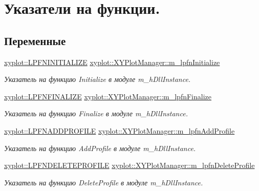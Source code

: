 \hypertarget{group__gr_func_pointers}{\section{Указатели на функции.}
\label{group__gr_func_pointers}
}
\subsection*{Переменные}
\begin{DoxyCompactItemize}
\item 
\hyperlink{namespacexyplot_a8c5635641ba2648c95a8b29c01393f78}{xyplot\-::\-L\-P\-F\-N\-I\-N\-I\-T\-I\-A\-L\-I\-Z\-E} \hyperlink{group__gr_func_pointers_ga4c9ea3fa9c04a9f11e5efbbf45484a77}{xyplot\-::\-X\-Y\-Plot\-Manager\-::m\-\_\-lpfn\-Initialize}
\begin{DoxyCompactList}\small\item\em Указатель на функцию Initialize в модуле m\-\_\-h\-Dll\-Instance. \end{DoxyCompactList}\item 
\hyperlink{namespacexyplot_a0c97b982a01a1c43f6900a274d295b11}{xyplot\-::\-L\-P\-F\-N\-F\-I\-N\-A\-L\-I\-Z\-E} \hyperlink{group__gr_func_pointers_ga9cdc9837f474268e30378babb487589c}{xyplot\-::\-X\-Y\-Plot\-Manager\-::m\-\_\-lpfn\-Finalize}
\begin{DoxyCompactList}\small\item\em Указатель на функцию Finalize в модуле m\-\_\-h\-Dll\-Instance. \end{DoxyCompactList}\item 
\hyperlink{namespacexyplot_ab78664aa6b50a88a556408cdcb0fedde}{xyplot\-::\-L\-P\-F\-N\-A\-D\-D\-P\-R\-O\-F\-I\-L\-E} \hyperlink{group__gr_func_pointers_gaa98936db9e4efece553498398bc6d097}{xyplot\-::\-X\-Y\-Plot\-Manager\-::m\-\_\-lpfn\-Add\-Profile}
\begin{DoxyCompactList}\small\item\em Указатель на функцию Add\-Profile в модуле m\-\_\-h\-Dll\-Instance. \end{DoxyCompactList}\item 
\hyperlink{namespacexyplot_af6412b804e2c4c568501d1a6e84358cd}{xyplot\-::\-L\-P\-F\-N\-D\-E\-L\-E\-T\-E\-P\-R\-O\-F\-I\-L\-E} \hyperlink{group__gr_func_pointers_ga7966fea312b93dc5a52ba8f913fcc835}{xyplot\-::\-X\-Y\-Plot\-Manager\-::m\-\_\-lpfn\-Delete\-Profile}
\begin{DoxyCompactList}\small\item\em Указатель на функцию Delete\-Profile в модуле m\-\_\-h\-Dll\-Instance. \end{DoxyCompactList}\item 

\end{DoxyCompactItemize}

